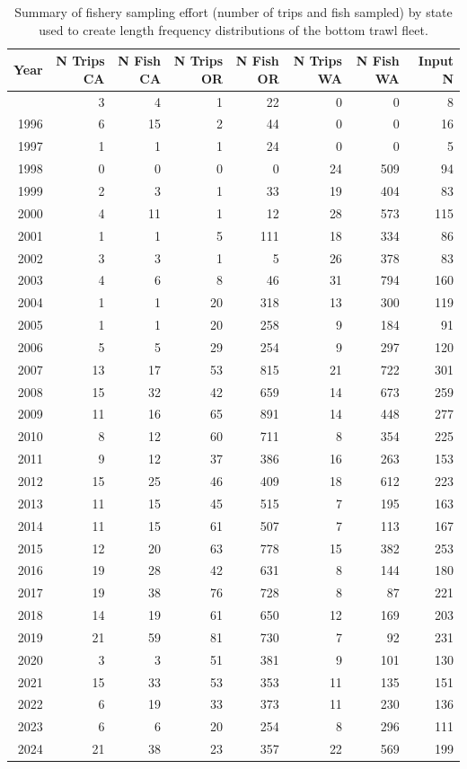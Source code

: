 \documentclass[
  english,
]{article}
\begin{document}
\endgroup

\newpage{}

\begingroup
\fontsize{9.0pt}{11.0pt}\selectfont

\begin{longtable}{rrrrrrrr}

\caption{\label{tbl-BT_lengths_sample_sizes}Summary of fishery sampling
effort (number of trips and fish sampled) by state used to create length
frequency distributions of the bottom trawl fleet.}

\tabularnewline

\toprule
Year & N Trips CA & N Fish CA & N Trips OR & N Fish OR & N Trips WA & N Fish WA & Input N \\ 
\midrule\addlinespace[2.5pt]
1995 & 3 & 4 & 1 & 22 & 0 & 0 & 8 \\ 
1996 & 6 & 15 & 2 & 44 & 0 & 0 & 16 \\ 
1997 & 1 & 1 & 1 & 24 & 0 & 0 & 5 \\ 
1998 & 0 & 0 & 0 & 0 & 24 & 509 & 94 \\ 
1999 & 2 & 3 & 1 & 33 & 19 & 404 & 83 \\ 
2000 & 4 & 11 & 1 & 12 & 28 & 573 & 115 \\ 
2001 & 1 & 1 & 5 & 111 & 18 & 334 & 86 \\ 
2002 & 3 & 3 & 1 & 5 & 26 & 378 & 83 \\ 
2003 & 4 & 6 & 8 & 46 & 31 & 794 & 160 \\ 
2004 & 1 & 1 & 20 & 318 & 13 & 300 & 119 \\ 
2005 & 1 & 1 & 20 & 258 & 9 & 184 & 91 \\ 
2006 & 5 & 5 & 29 & 254 & 9 & 297 & 120 \\ 
2007 & 13 & 17 & 53 & 815 & 21 & 722 & 301 \\ 
2008 & 15 & 32 & 42 & 659 & 14 & 673 & 259 \\ 
2009 & 11 & 16 & 65 & 891 & 14 & 448 & 277 \\ 
2010 & 8 & 12 & 60 & 711 & 8 & 354 & 225 \\ 
2011 & 9 & 12 & 37 & 386 & 16 & 263 & 153 \\ 
2012 & 15 & 25 & 46 & 409 & 18 & 612 & 223 \\ 
2013 & 11 & 15 & 45 & 515 & 7 & 195 & 163 \\ 
2014 & 11 & 15 & 61 & 507 & 7 & 113 & 167 \\ 
2015 & 12 & 20 & 63 & 778 & 15 & 382 & 253 \\ 
2016 & 19 & 28 & 42 & 631 & 8 & 144 & 180 \\ 
2017 & 19 & 38 & 76 & 728 & 8 & 87 & 221 \\ 
2018 & 14 & 19 & 61 & 650 & 12 & 169 & 203 \\ 
2019 & 21 & 59 & 81 & 730 & 7 & 92 & 231 \\ 
2020 & 3 & 3 & 51 & 381 & 9 & 101 & 130 \\ 
2021 & 15 & 33 & 53 & 353 & 11 & 135 & 151 \\ 
2022 & 6 & 19 & 33 & 373 & 11 & 230 & 136 \\ 
2023 & 6 & 6 & 20 & 254 & 8 & 296 & 111 \\ 
2024 & 21 & 38 & 23 & 357 & 22 & 569 & 199 \\ 
\bottomrule


\end{longtable}
\end{document}
